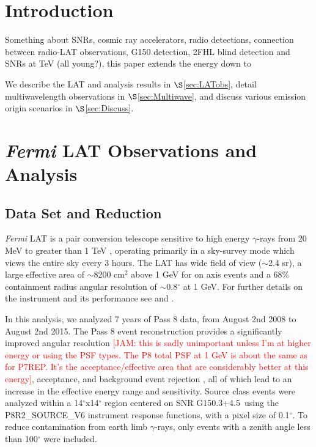 \documentclass[preprint2]{aastex}
\newcommand{\kibitz}[2]{\ifnum\Comments=1\textcolor{#1}{#2}\fi}
\newcommand{\jamie}[1]{\kibitz{red}      {[JAM: #1]}}
\newcommand{\gam}{$\gamma$-ray}
\newcommand{\FermiLat}{\emph{Fermi} LAT }     %
\newcommand{\Gone}{G150.3+4.5}
\begin{document}
%
%

\section{Introduction} 



Something about SNRs, cosmic ray accelerators, radio detections, connection between radio-LAT observations, G150 detection, 2FHL blind detection and SNRs at TeV (all young?), this paper extends the energy down to

We describe the LAT and analysis results in $\S$\ref{sec:LATobs}, detail multiwavelength observations in $\S$\ref{sec:Multiwave}, and discuss various emission origin scenarios in $\S$\ref{sec:Discuss}.
%
%
\section{\label{sec:LATobs}\FermiLat  Observations and  Analysis }
\subsection{\label{sec:LATdata}Data Set and Reduction}
\FermiLat is a pair conversion telescope sensitive to high energy \gam s  from 20 MeV to greater than 1 TeV \citep{2FHL}, operating primarily in a sky-survey mode which views  the entire sky every 3 hours. The LAT has wide field of view ($\sim$2.4 sr), a large effective area of $\sim$8200 cm$^2$ above 1 GeV for on axis events and a  68\% containment radius angular resolution  of $\sim$0.8$^\circ$  at 1 GeV. For further details  on the instrument and its performance see \cite{atwood09} and \cite{lat_perf}.

In this analysis, we  analyzed 7 years of Pass 8 data, from August 2nd 2008  to August 2nd 2015. The Pass 8 event reconstruction provides a significantly improved angular resolution \jamie{this is sadly unimportant unless I'm at higher energy or using the PSF types. The P8 total PSF at 1 GeV is about the same as for P7REP. It's the acceptance/effective area that are considerably better at this energy}, acceptance, and background event rejection \citep{atwood13b,atwood13}, all of which lead to an increase in the effective energy range and sensitivity. Source class events were analyzed within a 14$^\circ$x14$^\circ$ region centered on SNR \Gone~using the P8R2\_SOURCE\_V6 instrument response functions, with a pixel size of 0.1$^{\circ}$. To reduce contamination from earth limb \gam s, only events with a zenith angle less than 100$^{\circ}$ were included.
\end{document}
